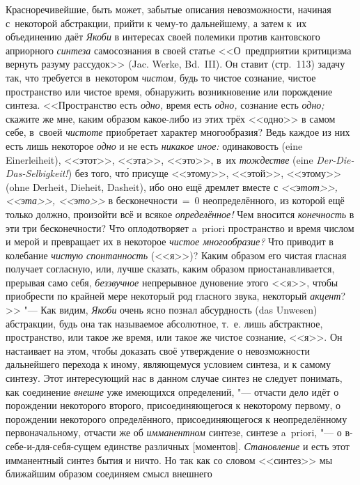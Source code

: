 Красноречивейшие, быть может, забытые описания невозможности, начиная
с~некоторой абстракции, прийти к чему-то дальнейшему, а затем к~их объединению
даёт {\em Якоби} в интересах своей полемики против кантовского априорного
{\em синтеза} самосознания в своей статье <<О~предприятии критицизма вернуть
разуму рассудок>> (Jac. Werke, Bd.~III). Он ставит (стр.~113) задачу так, что
требуется в~некотором {\em чистом,} будь то чистое сознание, чистое
пространство или чистое время, обнаружить возникновение или порождение синтеза.
<<Пространство есть {\em одно,} время есть {\em одно,} сознание есть
{\em одно;} скажите же мне, каким образом какое-либо из этих трёх <<одно>> в самом
себе, в~своей {\em чистоте} приобретает характер многообразия? Ведь
каждое из них есть лишь некоторое {\em одно} и не есть {\em никакое иное:}
одинаковость (eine Einer\-lei\-heit), <<этот>>, <<эта>>, <<это>>, в~их
{\em тождестве} (eine {\em Der-Die-Das-Selbigkeit!}) без того, чт\'{о} присуще
<<этому>>, <<этой>>, <<этому>> (ohne Derheit, Dieheit, Dasheit), ибо оно ещё
дремлет вместе с {\em <<этот>>, <<эта>>, <<это>>} в бесконечности~=~0
неопределённого, из которой ещё только должно, произойти всё и всякое
{\em определённое!} Чем вносится {\em конечность} в эти три бесконечности? Что
оплодотворяет a~priori пространство и время числом и мерой и превращает их в
некоторое {\em чистое многообразие?} Что приводит в колебание
{\em чистую спонтанность} (<<я>>)? Каким образом его чистая гласная получает согласную,
или, лучше сказать, каким образом приостанавливается, прерывая само себя,
{\em беззвучное} непрерывное дуновение этого <<я>>, чтобы приобрести по крайней мере
некоторый род гласного звука, некоторый {\em акцент}?>> "--- Как видим,
{\em Якоби} очень ясно познал абсурдность (das Unwesen) абстракции, будь она так
называемое абсолютное, т.~е. лишь абстрактное, пространство, или такое же
время, или такое же чистое сознание, <<я>>. Он настаивает на этом, чтобы
доказать своё утверждение о невозможности дальнейшего перехода к иному,
являющемуся условием синтеза, и к самому синтезу. Этот интересующий нас в
данном случае синтез не следует понимать, как соединение {\em внешне} уже
имеющихся определений, "--- отчасти дело идёт о порождении некоторого второго,
присоединяющегося к некоторому первому, о порождении некоторого определённого,
присоединяющегося к неопределённому первоначальному, отчасти же об {\em
имманентном} синтезе, синтезе a~priori, "--- о в-себе-и-для-себя-сущем единстве
различных [моментов]. {\em Становление} и есть этот имманентный синтез бытия и ничто. Но
так как со словом <<синтез>> мы ближайшим образом соединяем смысл внешнего
